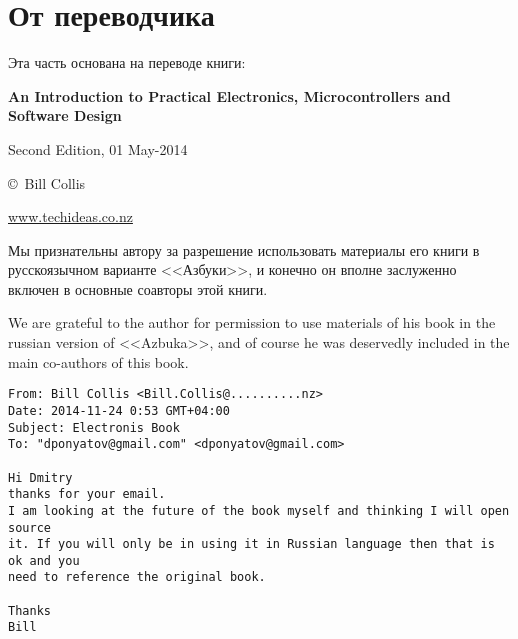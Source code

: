 \clearpage\section*{От переводчика}

Эта часть основана на переводе книги:
\bigskip

\textbf{An Introduction to Practical Electronics, Microcontrollers and Software
Design}

Second Edition, 01 May-2014

\copyright\ Bill Collis

\url{www.techideas.co.nz}

\bigskip
Мы признательны автору за разрешение использовать материалы его книги в
русскоязычном варианте <<Азбуки>>, и конечно он вполне заслуженно включен в
основные соавторы этой книги.

\bigskip
We are grateful to the author for permission to use materials of his book in the
russian version of <<Azbuka>>, and of course he was deservedly included in the
main co-authors of this book.

\bigskip
\begin{verbatim}
From: Bill Collis <Bill.Collis@..........nz>
Date: 2014-11-24 0:53 GMT+04:00
Subject: Electronis Book
To: "dponyatov@gmail.com" <dponyatov@gmail.com>

Hi Dmitry
thanks for your email.
I am looking at the future of the book myself and thinking I will open source
it. If you will only be in using it in Russian language then that is ok and you
need to reference the original book.

Thanks
Bill
\end{verbatim}
